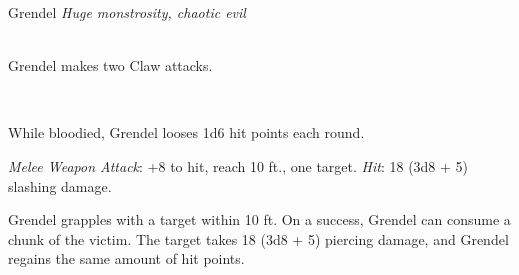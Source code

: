 \documentclass[10pt,twoside,twocolumn,openany]{book}
\begin{document}
\vspace{4.1cm}

\begin{monsterbox}{Grendel}
	\textit{Huge monstrosity, chaotic evil}\\
	\hline
	\basics[%
	armorclass = 12,
	hitpoints  = 105,
	speed      = 60 ft
	]
	\hline
	\stats[
    STR = \stat{25},
    DEX = \stat{8},
    CON = \stat{19},
    INT = \stat{5},
    WIS = \stat{10},
    CHA = \stat{7}
	]
	\hline
	\details[%
	senses = {darkvision 60ft., passive Perception 16},
	languages = {Common, Abyssal},
	damageimmunities = {Any armed attacks},
	damageresistances = {Magic},
	challenge = 5
	]
	\hline \\[1mm]
	\begin{monsteraction}[Multiattack]
		Grendel makes two Claw attacks.
	\end{monsteraction}\\
	\begin{monsteraction}[It Bleeds]
		While bloodied, Grendel looses 1d6 hit points each round.
	\end{monsteraction}
	\begin{monsteraction}[Claw]
		\textit{Melee Weapon Attack}: +8 to hit, reach 10 ft., one target. \textit{Hit}: 18 (3d8 + 5) slashing damage.
	\end{monsteraction}

	\begin{monsteraction}[Consume]
    	Grendel grapples with a target within 10 ft. On a success, Grendel can consume a chunk of the victim. The target takes 18 (3d8 + 5) piercing damage, and Grendel regains the same amount of hit points.
	\end{monsteraction}
\end{monsterbox}
\end{document}
